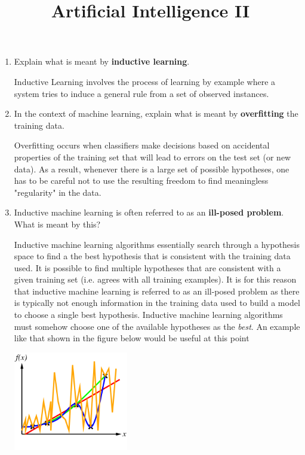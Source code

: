 \documentclass[solution]{ditpaper}
\title{Artificial Intelligence II}
\begin{document}

\question
\begin{enumerate}
	\item Explain what is meant by \textbf{inductive learning}.
	\begin{answer}
		Inductive Learning involves the process of learning by example where a system tries to induce a general rule from a set of observed instances.
	\end{answer}
		\item In the context of machine learning, explain what is meant by \textbf{overfitting} the training data.
	\begin{answer}
		Overfitting occurs when classifiers make decisions based on accidental properties of the training set that will lead to errors on the test set (or new data). As a result, whenever there is a large set of possible hypotheses, one has to be careful not to use the resulting freedom to find meaningless "regularity" in the data.
	\end{answer}	
		\item  Inductive machine learning is often referred to as an \textbf{ill-posed problem}. What is meant by this?
	\begin{answer}
		Inductive machine learning algorithms essentially search through a hypothesis space to find a the best hypothesis that is consistent with the training data used. It is possible to find multiple hypotheses that are  consistent with a given training set (i.e. agrees with all training examples).  It is for this reason that inductive machine learning is referred to as an ill-posed problem as there is typically not enough information in the training data used to build a model to choose a single best hypothesis. Inductive machine learning algorithms must somehow choose one of the available hypotheses as the \emph{best}. An example like that shown in the figure below would be useful at this point
		\begin{center}
			\includegraphics[width=5cm]{./images/curve-fitting5.png}

\end{center}
\end{answer}
\end{enumerate}
\end{document}
